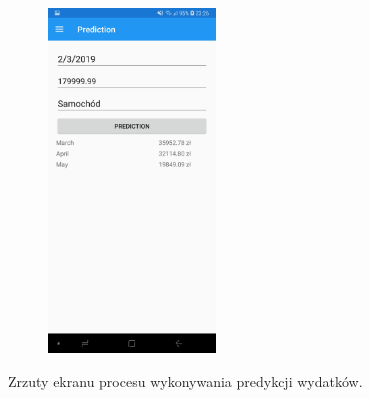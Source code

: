 \begin{figure}[!ht]
\begin{center}
\begin{subfigure}[b]{0.3\textwidth}
			\label{predykcja}
		\end{subfigure}
		\begin{subfigure}[b]{0.3\textwidth}
			\includegraphics[width=1.75in]{img/mobile/predykcja_gotowe.jpg}
			\label{predykcja_gotowe}
		\end{subfigure}
	\end{center}
	\caption{Zrzuty ekranu procesu wykonywania predykcji wydatków.}
\end{figure}